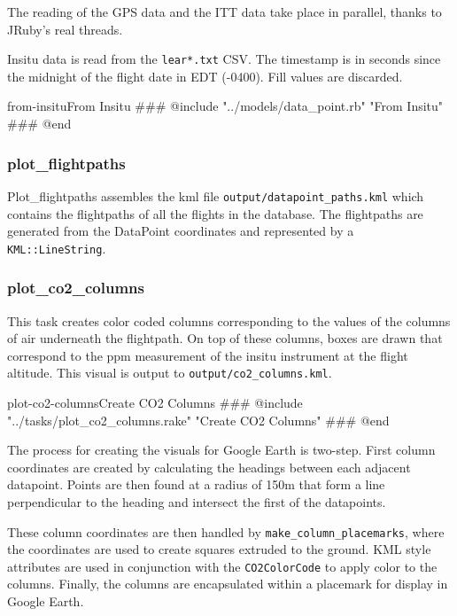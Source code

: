 \documentclass[12pt]{article}
\begin{document}
The reading of the GPS data and the ITT data take place in parallel, thanks to JRuby's real threads.


Insitu data is read from the \texttt{lear*.txt} CSV.  The timestamp is in seconds since the midnight of the flight date in EDT (-0400).  Fill values are discarded.

\begin{code}{from-insitu}{From Insitu}
### @include "../models/data_point.rb" "From Insitu"
### @end
\end{code}

\subsubsection*{plot\_flightpaths}

Plot\_flightpaths assembles the kml file \texttt{output/datapoint\_paths.kml} which contains the flightpaths of all the flights in the database.  The flightpaths are generated from the DataPoint coordinates and represented by a \texttt{KML::LineString}.

\subsubsection*{plot\_co2\_columns}

This task creates color coded columns corresponding to the values of the columns of air underneath the flightpath.  On top of these columns, boxes are drawn that correspond to the ppm measurement of the insitu instrument at the flight altitude.  This visual is output to \texttt{output/co2\_columns.kml}.

\begin{code}{plot-co2-columns}{Create CO2 Columns}
### @include "../tasks/plot_co2_columns.rake" "Create CO2 Columns"
### @end
\end{code}

The process for creating the visuals for Google Earth is two-step.  First column coordinates are created by calculating the headings between each adjacent datapoint.  Points are then found at a radius of 150m that form a line perpendicular to the heading and intersect the first of the datapoints.

These column coordinates are then handled by \texttt{make\_column\_placemarks}, where the coordinates are used to create squares extruded to the ground.  KML style attributes are used in conjunction with the \texttt{CO2ColorCode} to apply color to the columns. Finally, the columns are encapsulated within a placemark for display in Google Earth.  
\end{document}
